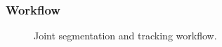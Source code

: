 \begin{frame}
    \frametitle{Workflow}
    \begin{figure}
        \centering
        \scalebox{0.65}{
            
        }
        \caption{Joint segmentation and tracking workflow.}
        \label{fig:joint-pipeline}
    \end{figure}
\end{frame}


